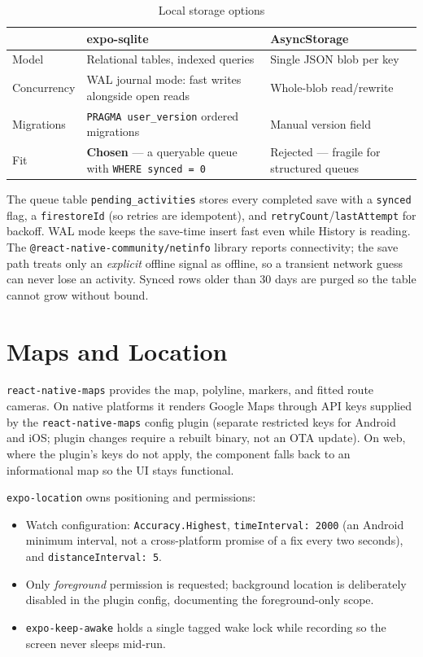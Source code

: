 \documentclass[12pt, a4paper]{report}
\newcommand{\pkg}[1]{\texttt{#1}}
\newcommand{\code}[1]{\texttt{#1}}
\begin{document}
\begin{table}[H]
\centering
\caption{Local storage options}
\label{tab:localdb}
\small
\begin{tabularx}{\textwidth}{@{}l L L@{}}
\toprule
 & \textbf{expo-sqlite} & \textbf{AsyncStorage} \\
\midrule
Model & Relational tables, indexed queries & Single JSON blob per key \\
Concurrency & WAL journal mode: fast writes alongside open reads & Whole-blob
  read/rewrite \\
Migrations & \code{PRAGMA user\_version} ordered migrations & Manual version
  field \\
Fit & \textbf{Chosen} --- a queryable queue with \code{WHERE synced = 0}
  & Rejected --- fragile for structured queues \\
\bottomrule
\end{tabularx}
\end{table}

\noindent The queue table \code{pending\_activities} stores every completed
save with a \code{synced} flag, a \code{firestoreId} (so retries are
idempotent), and \code{retryCount}/\code{lastAttempt} for backoff. WAL mode
keeps the save-time insert fast even while History is reading. The
\code{@react-native-community/netinfo} library reports connectivity; the
save path treats only an \emph{explicit} offline signal as offline, so a
transient network guess can never lose an activity. Synced rows older than
30 days are purged so the table cannot grow without bound.

\section{Maps and Location}
\pkg{react-native-maps} provides the map, polyline, markers, and fitted
route cameras. On native platforms it renders Google Maps through API keys
supplied by the \code{react-native-maps} config plugin (separate restricted
keys for Android and iOS; plugin changes require a rebuilt binary, not an OTA
update). On web, where the plugin's keys do not apply, the component falls
back to an informational map so the UI stays functional.

\pkg{expo-location} owns positioning and permissions:

\begin{itemize}[leftmargin=1.2cm]
  \item Watch configuration: \code{Accuracy.Highest},
        \code{timeInterval: 2000} (an Android minimum interval, not a
        cross-platform promise of a fix every two seconds), and
        \code{distanceInterval: 5}.
  \item Only \emph{foreground} permission is requested; background location
        is deliberately disabled in the plugin config, documenting the
        foreground-only scope.
  \item \pkg{expo-keep-awake} holds a single tagged wake lock while
        recording so the screen never sleeps mid-run.
\end{itemize}
\end{document}
